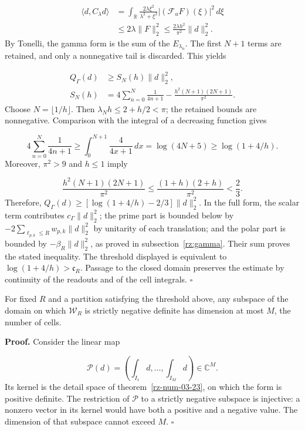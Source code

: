 \[
\begin{aligned}
\langle d,C_\lambda d\rangle
&=\int_{\mathbb R}
\frac{2\lambda\xi^2}{\lambda^2+\xi^2}
|(\mathcal F_u F)(\xi)|^2\,d\xi\\
&\leq2\lambda\|F\|_2^2
\leq\frac{2\lambda h^2}{\pi^2}\|d\|_2^2.
\end{aligned}
\]
By Tonelli, the gamma form is the sum of the \(E_{\lambda_n}\). The first \(N+1\) terms are retained, and only a nonnegative tail is discarded. This yields

\[
\begin{aligned}
Q_\Gamma(d)&\geq S_N(h)\|d\|_2^2,\\
S_N(h)&=4\sum_{n=0}^N\frac1{4n+1}
-\frac{h^2(N+1)(2N+1)}{\pi^2}.
\end{aligned}
\]
Choose \(N=\lfloor1/h\rfloor\). Then \(\lambda_N h\leq2+h/2<\pi\); the retained bounds are nonnegative. Comparison with the integral of a decreasing function gives

\[
4\sum_{n=0}^N\frac1{4n+1}
\geq\int_0^{N+1}\frac4{4x+1}\,dx
=\log(4N+5)\geq\log(1+4/h).
\]
Moreover, \(\pi^2>9\) and \(h\leq1\) imply

\[
\frac{h^2(N+1)(2N+1)}{\pi^2}
\leq\frac{(1+h)(2+h)}{\pi^2}<\frac23.
\]
Therefore, \(Q_\Gamma(d)\geq[\log(1+4/h)-2/3]\|d\|_2^2\). In the full form, the scalar term contributes \(c_\Gamma\|d\|_2^2\); the prime part is bounded below by \(-2\sum_{\ell_{p,k}\leq R}w_{p,k}\|d\|_2^2\) by unitarity of each translation; and the polar part is bounded by \(-\beta_R\|d\|_2^2\), as proved in subsection~\ref{rz:gamma}. Their sum proves the stated inequality. The threshold displayed is equivalent to \(\log(1+4/h)>\mathfrak c_R\). Passage to the closed domain preserves the estimate by continuity of the readouts and of the cell integrals. \hfill\(\square\)

For fixed \(R\) and a partition satisfying the threshold above, any subspace of the domain on which \(\mathscr W_R\) is strictly negative definite has dimension at most \(M\), the number of cells.

\textbf{Proof.} Consider the linear map

\[
\mathcal P(d)=\left(\int_{I_1}d,\ldots,
\int_{I_M}d\right)\in\mathbb C^M.
\]
Its kernel is the detail space of theorem~\ref{rz-num-03-23}, on which the form is positive definite. The restriction of \(\mathcal P\) to a strictly negative subspace is injective: a nonzero vector in its kernel would have both a positive and a negative value. The dimension of that subspace cannot exceed \(M\). \hfill\(\square\)

